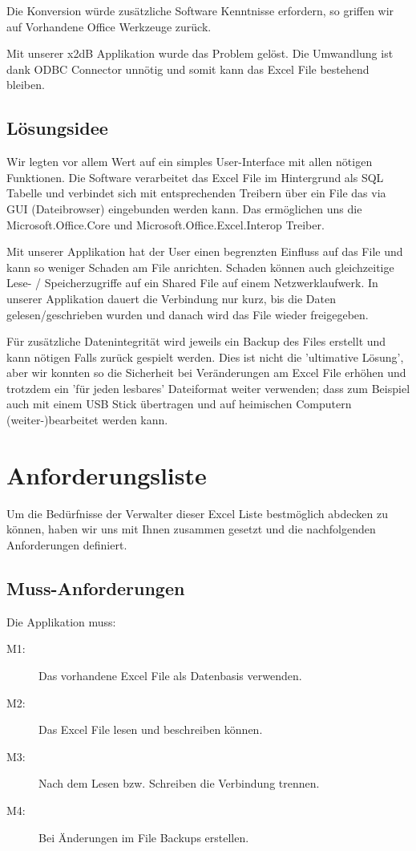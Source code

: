 \documentclass{article}
\begin{document}
Die Konversion würde zusätzliche Software Kenntnisse erfordern, so griffen wir auf Vorhandene Office Werkzeuge zurück.

Mit unserer x2dB Applikation wurde das Problem gelöst. Die Umwandlung ist dank ODBC Connector unnötig und somit kann das Excel File bestehend bleiben.

\subsection{Lösungsidee}
Wir legten vor allem Wert auf ein simples User-Interface mit allen nötigen Funktionen. Die Software verarbeitet das Excel File im Hintergrund als SQL Tabelle und verbindet sich mit entsprechenden Treibern über ein File das via GUI (Dateibrowser) eingebunden werden kann. Das ermöglichen uns die Microsoft.Office.Core und Microsoft.Office.Excel.Interop Treiber.

Mit unserer Applikation hat der User einen begrenzten Einfluss auf das File und kann so weniger Schaden am File anrichten. Schaden können auch gleichzeitige Lese- / Speicherzugriffe auf ein Shared File auf einem Netzwerklaufwerk. In unserer Applikation dauert die Verbindung nur kurz, bis die Daten gelesen/geschrieben wurden und danach wird das File wieder freigegeben.

Für zusätzliche Datenintegrität wird jeweils ein Backup des Files erstellt und kann nötigen Falls zurück gespielt werden. Dies ist nicht die 'ultimative Lösung', aber wir konnten so die Sicherheit bei Veränderungen am Excel File erhöhen und trotzdem ein 'für jeden lesbares' Dateiformat weiter verwenden; dass zum Beispiel auch mit einem USB Stick übertragen und auf heimischen Computern (weiter-)bearbeitet werden kann.

\newpage

\section{Anforderungsliste}
Um die Bedürfnisse der Verwalter dieser Excel Liste bestmöglich abdecken zu können, haben wir uns mit Ihnen zusammen gesetzt und die nachfolgenden Anforderungen definiert. 
	
\subsection{Muss-Anforderungen}
Die Applikation muss:
	\begin{description}
		\item[M1:] Das vorhandene Excel File als Datenbasis verwenden.
		\item[M2:] Das Excel File lesen und beschreiben können.
		\item[M3:] Nach dem Lesen bzw. Schreiben die Verbindung trennen.
		\item[M4:] Bei Änderungen im File Backups erstellen.
	\end{description}
\end{document}
